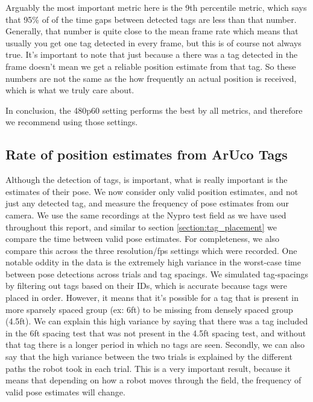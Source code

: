 \documentclass{article}
\begin{document}
    Arguably the most important metric here is the 9th percentile metric, which says that 95\% of of the time gaps between detected tags are less than that number. Generally, that number is quite close to the mean frame rate which means that usually you get one tag detected in every frame, but this is of course not always true. It's important to note that just because a there was a tag detected in the frame doesn't mean we get a reliable position estimate from that tag. So these numbers are not the same as the how frequently an actual position is received, which is what we truly care about.

    In conclusion, the 480p60 setting performs the best by all metrics, and therefore we recommend using those settings.

  \subsection{Rate of position estimates from ArUco Tags}

    Although the detection of tags, is important, what is really important is the estimates of their pose. We now consider only valid position estimates, and not just any detected tag, and measure the frequency of pose estimates from our camera. We use the same recordings at the Nypro test field as we have used throughout this report, and similar to section \ref{section:tag_placement} we compare the time between valid pose estimates. For completeness, we also compare this across the three resolution/fps settings which were recorded. One notable oddity in the data is the extremely high variance in the worst-case time between pose detections across trials and tag spacings. We simulated tag-spacings by filtering out tags based on their IDs, which is accurate because tags were placed in order. However, it means that it's possible for a tag that is present in more sparsely spaced group (ex: 6ft) to be missing from densely spaced group (4.5ft). We can explain this high variance by saying that there was a tag included in the 6ft spacing test that was not present in the 4.5ft spacing test, and without that tag there is a longer period in which no tags are seen. Secondly, we can also say that the high variance between the two trials is explained by the different paths the robot took in each trial. This is a very important result, because it means that depending on how a robot moves through the field, the frequency of valid pose estimates will change.
\end{document}
